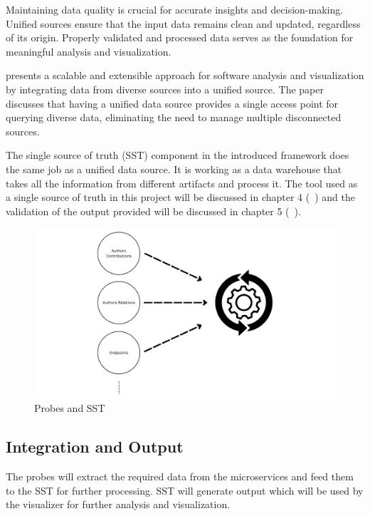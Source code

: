 Maintaining data quality is crucial for accurate insights and decision-making. Unified sources ensure that the input data remains clean and updated, regardless of its origin. Properly validated and processed data serves as the foundation for meaningful analysis and visualization.

\citep{MullerUdsforSA2018} presents a scalable and extensible approach for software analysis and visualization by integrating data from diverse sources into a unified source. The paper discusses that having a unified data source provides a single access point for querying diverse data, eliminating the need to manage multiple disconnected sources. 

The single source of truth (SST) component in the introduced framework does the same job as a unified data source. It is working as a data warehouse that takes all the information from different artifacts and process it. The tool used as a single source of truth in this project will be discussed in chapter 4 (~) and the validation of the output provided will be discussed in chapter 5 (~).

\begin{figure}[H]
    \centering
    \includegraphics[width=1\textwidth]{figures/sst_working.png}
    \caption[Probes and SST]{Probes and SST}
    \label{fig_probes_sst}
\end{figure}

\subsection{Integration and Output}

The probes will extract the required data from the microservices and feed them to the SST for further processing. SST will generate output which will be used by the visualizer for further analysis and visualization.

